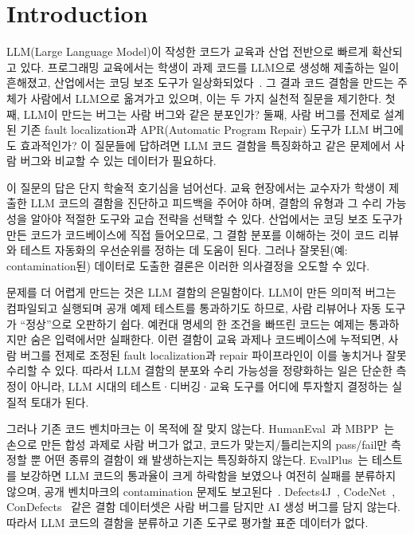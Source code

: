 \documentclass[10pt,conference]{IEEEtran}
\begin{document}
\section{Introduction}
LLM(Large Language Model)이 작성한 코드가 교육과 산업 전반으로 빠르게 확산되고 있다. 프로그래밍 교육에서는 학생이 과제 코드를 LLM으로 생성해 제출하는 일이 흔해졌고, 산업에서는 코딩 보조 도구가 일상화되었다~\cite{chen2021codex,tambon2025bugs}. 그 결과 코드 결함을 만드는 주체가 사람에서 LLM으로 옮겨가고 있으며, 이는 두 가지 실천적 질문을 제기한다. 첫째, LLM이 만드는 버그는 사람 버그와 같은 분포인가? 둘째, 사람 버그를 전제로 설계된 기존 fault localization과 APR(Automatic Program Repair) 도구가 LLM 버그에도 효과적인가? 이 질문들에 답하려면 LLM 코드 결함을 특징화하고 같은 문제에서 사람 버그와 비교할 수 있는 데이터가 필요하다.

이 질문의 답은 단지 학술적 호기심을 넘어선다. 교육 현장에서는 교수자가 학생이 제출한 LLM 코드의 결함을 진단하고 피드백을 주어야 하며, 결함의 유형과 그 수리 가능성을 알아야 적절한 도구와 교습 전략을 선택할 수 있다. 산업에서는 코딩 보조 도구가 만든 코드가 코드베이스에 직접 들어오므로, 그 결함 분포를 이해하는 것이 코드 리뷰와 테스트 자동화의 우선순위를 정하는 데 도움이 된다. 그러나 잘못된(예: contamination된) 데이터로 도출한 결론은 이러한 의사결정을 오도할 수 있다.

문제를 더 어렵게 만드는 것은 LLM 결함의 은밀함이다. LLM이 만든 의미적 버그는 컴파일되고 실행되며 공개 예제 테스트를 통과하기도 하므로, 사람 리뷰어나 자동 도구가 ``정상''으로 오판하기 쉽다. 예컨대 명세의 한 조건을 빠뜨린 코드는 예제는 통과하지만 숨은 입력에서만 실패한다. 이런 결함이 교육 과제나 코드베이스에 누적되면, 사람 버그를 전제로 조정된 fault localization과 repair 파이프라인이 이를 놓치거나 잘못 수리할 수 있다. 따라서 LLM 결함의 분포와 수리 가능성을 정량화하는 일은 단순한 측정이 아니라, LLM 시대의 테스트·디버깅·교육 도구를 어디에 투자할지 결정하는 실질적 토대가 된다.

그러나 기존 코드 벤치마크는 이 목적에 잘 맞지 않는다. HumanEval~\cite{chen2021codex}과 MBPP~\cite{austin2021mbpp}는 손으로 만든 합성 과제로 사람 버그가 없고, 코드가 맞는지/틀리는지의 pass/fail만 측정할 뿐 어떤 종류의 결함이 왜 발생하는지는 특징화하지 않는다. EvalPlus~\cite{liu2023evalplus}는 테스트를 보강하면 LLM 코드의 통과율이 크게 하락함을 보였으나 여전히 실패를 분류하지 않으며, 공개 벤치마크의 contamination 문제도 보고된다~\cite{golchin2024contamination}. Defects4J~\cite{just2014defects4j}, CodeNet~\cite{puri2021codenet}, ConDefects~\cite{wu2023condefects} 같은 결함 데이터셋은 사람 버그를 담지만 AI 생성 버그를 담지 않는다. 따라서 LLM 코드의 결함을 분류하고 기존 도구로 평가할 표준 데이터가 없다.
\end{document}
